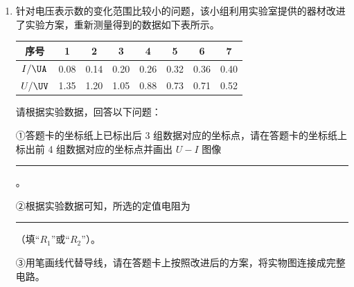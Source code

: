 \documentclass[\gkver]{gaokaozhenti}
\begin{document}
\begin{enumerate}
\begin{enumerate}
A．电压表分流

B．干电池内阻较小

C．滑动变阻器最大阻值较小

D．电流表内阻较小


\item
针对电压表示数的变化范围比较小的问题，该小组利用实验室提供的器材改进了实验方案，重新测量得到的数据如下表所示。

\begin{center}
\begin{tabular}{|c|c|c|c|c|c|c|c|}
\hline
序号 & 1 & 2 & 3 & 4 & 5 & 6 & 7 \\
\hline
$I/\UA$ & 0.08 & 0.14 & 0.20 & 0.26 & 0.32 & 0.36 & 0.40 \\
\hline
$U/\UV$ & 1.35 & 1.20 & 1.05 & 0.88 & 0.73 & 0.71 & 0.52 \\
\hline
\end{tabular}
\end{center}

请根据实验数据，回答以下问题：

①答题卡的坐标纸上已标出后 3 组数据对应的坐标点，请在答题卡的坐标纸上标出前 4 组数据对应的坐标点并画出 $U-I$ 图像\rule{1.5cm}{0.4pt}。


②根据实验数据可知，所选的定值电阻为\rule{1.5cm}{0.4pt}（填“$R_{1}$”或“$R_{2}$”）。

③用笔画线代替导线，请在答题卡上按照改进后的方案，将实物图连接成完整电路。

\end{enumerate}

\end{enumerate}
\end{document}
